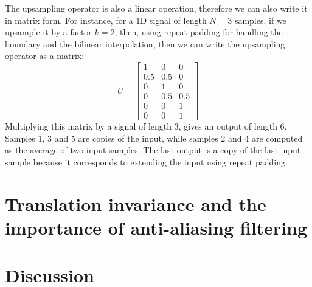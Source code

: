 The upsampling operator is also a linear operation, therefore we can also write it in matrix form. For instance, for a 1D signal of length $N=3$  samples, if we upsample it by a factor $k=2$, then, using repeat padding for handling the boundary and the bilinear interpolation, then we can write the upsampling operator as a matrix:
\begin{equation}
U = \left[ 
\begin{array}{ccc}
1    & 0    & 0 \\
0.5 & 0.5 & 0 \\
0    & 1    & 0 \\
0    & 0.5 & 0.5 \\
0    & 0    & 1 \\
0    & 0    & 1 
\end{array}
\right]
\end{equation}
Multiplying this matrix by a signal of length 3, gives an output of length 6. Samples 1, 3 and 5 are copies of the input, while samples 2 and 4 are computed as the average of two input samples. The last output is a copy of the last input sample because it corresponds to extending the input using repeat padding.


\section{Translation invariance and the importance of anti-aliasing filtering}


\section{Discussion}


